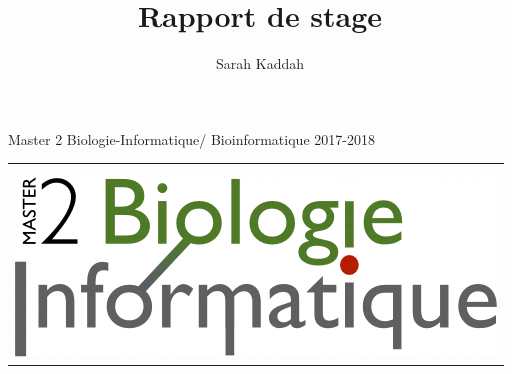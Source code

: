 \documentclass[12pt,a4paper]{article}
\author{Sarah Kaddah}
\title{Rapport de stage}
\begin{document}
\begin{titlepage}
  \begin{sffamily}
  \begin{center}
	\large{Master 2 Biologie-Informatique/ Bioinformatique \hfill 2017-2018}
	

\begin{tabular}{c}
\\ \\ \\
\includegraphics[scale=0.3]{img/m2.png}
\end{tabular}
\hfill
\begin{tabular}{c}
\\

\end{tabular}
\end{center}
\end{sffamily}
\end{titlepage}
\end{document}
